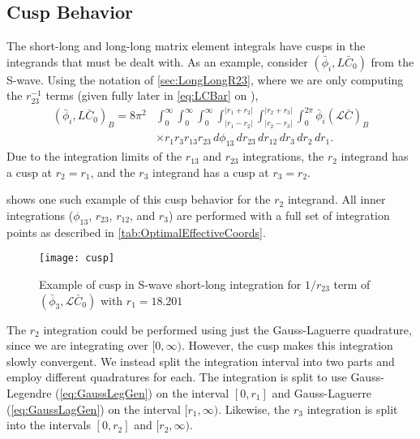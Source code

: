 \documentclass[Dissertation.tex]{subfiles}
\begin{document}
\subsection{Cusp Behavior}
\label{sec:Cusps}

The short-long and long-long matrix element integrals have cusps in the
integrands that must be dealt with. As an example, consider
$(\bar{\phi}_i, L\bar{C}_0)$ from the S-wave. Using the notation of
\cref{sec:LongLongR23}, where we are only computing the $r_{23}^{-1}$ terms
(given fully later in \cref{eq:LCBar} on \pageref{eq:LCBar}),
\begin{align}
(\bar{\phi}_i, L\bar{C}_0)_B = 8\pi^2 & \int_0^\infty \int_0^\infty \int_0^\infty \int_{|r_1 - r_2|}^{|r_1 + r_2|} \int_{|r_2 - r_3|}^{|r_2 + r_3|} \int_0^{2\pi} \bar{\phi}_i (\mathcal{L} \bar{C})_B  \nonumber \\
& \times r_1 r_3 r_{13} r_{23}\, d\phi_{13}\, dr_{23}\, dr_{12}\, dr_3\, dr_2\, dr_1.
\end{align}
Due to the integration limits of the $r_{13}$ and $r_{23}$ integrations, the
$r_2$ integrand has a cusp at $r_2 = r_1$, and the $r_3$ integrand has a cusp
at $r_3 = r_2$.

 shows one such example of this cusp behavior for the $r_2$ 
integrand. All inner integrations ($\phi_{13}$, $r_{23}$, $r_{12}$, and $r_3$)
are performed with a full set of integration points as described in
\cref{tab:OptimalEffectiveCoords}.

\begin{figure}[H]
	\centering
	\texttt{[image: cusp]}
	\caption[Example of cusp in S-wave short-long integration]{Example of cusp
in S-wave short-long integration for $1/r_{23}$ term of
$(\bar{\phi}_3, \mathcal{L}\bar{C}_0)$ with \mbox{$r_1 = 18.201$}}
	\label{fig:cusp}
\end{figure}

The $r_2$ integration could be performed using just the Gauss-Laguerre 
quadrature, since we are integrating over $[0,\infty)$. However, the cusp 
makes this integration slowly convergent. We instead split the integration 
interval into two parts and employ different quadratures for each. The 
integration is split to use Gauss-Legendre (\cref{eq:GaussLegGen}) on the 
interval $[0,r_1]$ and Gauss-Laguerre (\cref{eq:GaussLagGen}) on the interval 
$[r_1,\infty)$. Likewise, the $r_3$ integration is split into the intervals
$[0,r_2]$ and $[r_2,\infty)$.
\end{document}
